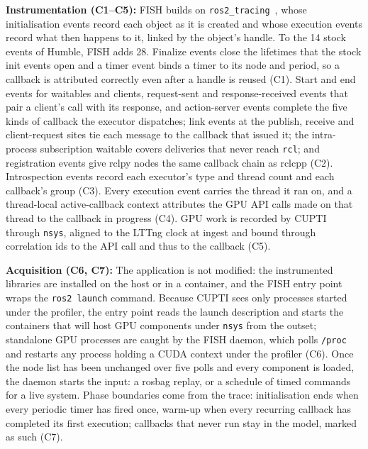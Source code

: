 \textbf{Instrumentation (C1--C5):} FISH builds on \texttt{ros2\_tracing}~\cite{bedard-2022-ros2tracing}, whose initialisation events record each object as it is created and whose execution events record what then happens to it, linked by the object's handle. To the 14 stock events of Humble, FISH adds 28. Finalize events close the lifetimes that the stock init events open and a timer event binds a timer to its node and period, so a callback is attributed correctly even after a handle is reused (C1). Start and end events for waitables and clients, request-sent and response-received events that pair a client's call with its response, and action-server events complete the five kinds of callback the executor dispatches; link events at the publish, receive and client-request sites tie each message to the callback that issued it; the intra-process subscription waitable covers deliveries that never reach \texttt{rcl}; and registration events give rclpy nodes the same callback chain as rclcpp (C2). Introspection events record each executor's type and thread count and each callback's group (C3). Every execution event carries the thread it ran on, and a thread-local active-callback context attributes the GPU API calls made on that thread to the callback in progress (C4). GPU work is recorded by CUPTI through \texttt{nsys}, aligned to the LTTng clock at ingest and bound through correlation ids to the API call and thus to the callback (C5).

\textbf{Acquisition (C6, C7):} The application is not modified: the instrumented libraries are installed on the host or in a container, and the FISH entry point wraps the \texttt{ros2 launch} command. Because CUPTI sees only processes started under the profiler, the entry point reads the launch description and starts the containers that will host GPU components under \texttt{nsys} from the outset; standalone GPU processes are caught by the FISH daemon, which polls \texttt{/proc} and restarts any process holding a CUDA context under the profiler (C6). Once the node list has been unchanged over five polls and every component is loaded, the daemon starts the input: a rosbag replay, or a schedule of timed commands for a live system. Phase boundaries come from the trace: initialisation ends when every periodic timer has fired once, warm-up when every recurring callback has completed its first execution; callbacks that never run stay in the model, marked as such (C7).

